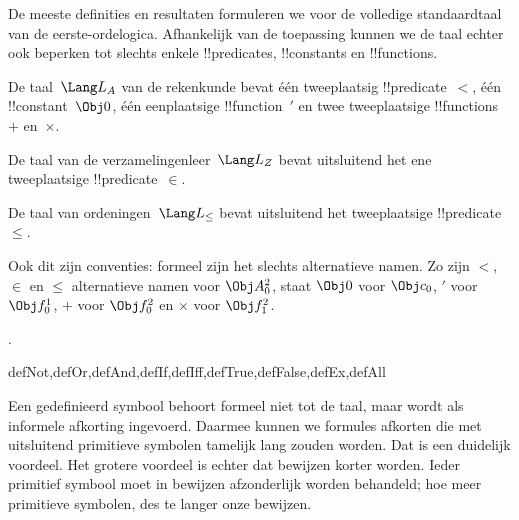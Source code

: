\documentclass[openany]{memoir}
\begin{document}
De meeste definities en resultaten formuleren we voor de volledige
standaardtaal van de eerste-ordelogica. Afhankelijk van de toepassing
kunnen we de taal echter ook beperken tot slechts enkele
!!{predicate}s, !!{constant}s en !!{function}s.

\begin{ex}
De taal~$\Lang L_A$ van de rekenkunde bevat één tweeplaatsig
!!{predicate}~$<$, één !!{constant}~$\Obj 0$, één eenplaatsige
!!{function}~$\prime$ en twee tweeplaatsige !!{function}s~$+$ en~$\times$.
\end{ex}

\begin{ex}
De taal van de verzamelingenleer~$\Lang L_Z$ bevat uitsluitend het ene
tweeplaatsige !!{predicate}~$\in$.
\end{ex}

\begin{ex}
De taal van ordeningen~$\Lang L_\le$ bevat uitsluitend het
tweeplaatsige !!{predicate}~$\le$.
\end{ex}

Ook dit zijn conventies: formeel zijn het slechts alternatieve namen.
Zo zijn $<$, $\in$ en $\le$ alternatieve namen voor $\Obj A^2_0$, staat
$\Obj 0$ voor $\Obj c_0$, $\prime$ voor $\Obj f^1_0$, $+$ voor
$\Obj f^2_0$ en $\times$ voor $\Obj f^2_1$.

.

\begin{tagblock}{defNot,defOr,defAnd,defIf,defIff,defTrue,defFalse,defEx,defAll}
\begin{explain}
Een gedefinieerd symbool behoort formeel niet tot de taal, maar wordt
als informele afkorting ingevoerd. Daarmee kunnen we formules afkorten
die met uitsluitend primitieve symbolen tamelijk lang zouden worden.
Dat is een duidelijk voordeel. Het grotere voordeel is echter dat
bewijzen korter worden. Ieder primitief symbool moet in bewijzen
afzonderlijk worden behandeld; hoe meer primitieve symbolen, des te
langer onze bewijzen.
\end{explain}
\end{tagblock}
\end{document}
